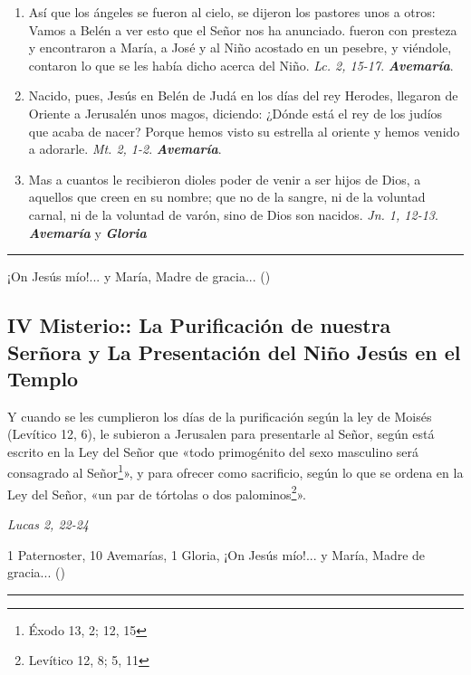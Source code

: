 \documentclass[./rosary.tex]{subfiles}
\begin{document}
\begin{enumerate}
    \item Así que los ángeles se fueron al cielo, se dijeron los pastores unos a otros: Vamos a Belén a ver esto que el Señor nos ha anunciado. fueron
          con presteza y encontraron a María, a José y al Niño acostado en un pesebre, y viéndole, contaron lo que se les había dicho acerca del
          Niño. \emph{Lc. 2, 15-17}. \textbf{\emph{Avemaría}}.

    \item Nacido, pues, Jesús en Belén de Judá en los días del rey Herodes, llegaron de Oriente a Jerusalén unos magos, diciendo: ¿Dónde está el rey de los judíos
          que acaba de nacer? Porque hemos visto su estrella al oriente y hemos venido a adorarle. \emph{Mt. 2, 1-2}. \textbf{\emph{Avemaría}}.

    \item Mas a cuantos le recibieron dioles poder de venir a ser hijos de Dios, a aquellos que creen en su nombre; que no de la sangre, ni de la voluntad carnal,
          ni de la voluntad de varón, sino de Dios son nacidos. \emph{Jn. 1, 12-13}. \textbf{\emph{Avemaría}} y \textbf{\emph{Gloria}}
\end{enumerate}

\rule{\textwidth}{0.5pt}
¡On Jesús mío!... y María, Madre de gracia... ()

\subsection*{IV Misterio:: La Purificación de nuestra Serñora y La Presentación del Niño Jesús en el Templo}

Y cuando se les cumplieron los días de la purificación según la ley de Moisés (Levítico 12, 6),
le subieron a Jerusalen para presentarle al Señor, según está escrito en la Ley del Señor que «todo primogénito
del sexo masculino será consagrado al Señor\footnote{Éxodo 13, 2; 12, 15\label{primogenito}}», y para ofrecer como sacrificio,
según lo que se ordena en la Ley del Señor, «un par de tórtolas o dos palominos\footnote{Levítico 12, 8; 5, 11\label{sacrificio}}».
\begin{flushright}
    \emph{Lucas 2, 22-24}
\end{flushright}

1 Paternoster, 10 Avemarías, 1 Gloria, ¡On Jesús mío!... y María, Madre de gracia... ()

\rule{\textwidth}{0.5pt}
\end{document}
